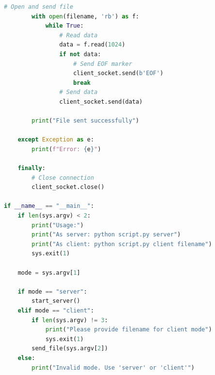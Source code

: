 \documentclass{article}
\begin{document}
\begin{lstlisting}[language=Python]
        # Open and send file
        with open(filename, 'rb') as f:
            while True:
                # Read data
                data = f.read(1024)
                if not data:
                    # Send EOF marker
                    client_socket.send(b'EOF')
                    break
                # Send data
                client_socket.send(data)
        
        print("File sent successfully")
        
    except Exception as e:
        print(f"Error: {e}")
        
    finally:
        # Close connection
        client_socket.close()

if __name__ == "__main__":
    if len(sys.argv) < 2:
        print("Usage:")
        print("As server: python script.py server")
        print("As client: python script.py client filename")
        sys.exit(1)
    
    mode = sys.argv[1]
    
    if mode == "server":
        start_server()
    elif mode == "client":
        if len(sys.argv) != 3:
            print("Please provide filename for client mode")
            sys.exit(1)
        send_file(sys.argv[2])
    else:
        print("Invalid mode. Use 'server' or 'client'")
\end{lstlisting}
\end{document}
